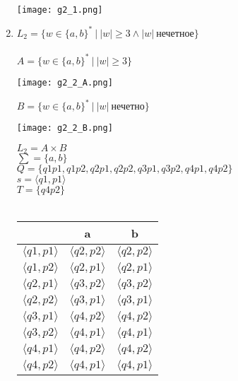 \documentclass{article}
\begin{document}
\begin{enumerate}
    \\ 
    \begin{flushleft}
        \texttt{[image: g2\_1.png]}
    \end{flushleft}
    \item {$L_2 = \{ w \in \{ a, b\}^* \ | \ |w| \geq 3 \wedge |w| \ \text{нечетное} \}$} \\ \\
    $A = \{ w \in \{ a, b\}^* \ | \ |w| \geq 3 \}$
    \begin{flushleft}
        \texttt{[image: g2\_2\_A.png]}
    \end{flushleft}
    $B = \{ w \in \{ a, b\}^* \ | \ |w| \ \text{нечетно} \}$
    \begin{flushleft}
        \texttt{[image: g2\_2\_B.png]}
    \end{flushleft}
    $L_2 = A \times B$ \\
    $\sum = \{a, b\}$ \\
    $Q = \{q1p1, q1p2, q2p1, q2p2, q3p1, q3p2, q4p1, q4p2\}$ \\
    $s = \langle q1, p1 \rangle $ \\
    $T = \{q4p2\}$ \\ \\
    \begin{tabular}{|c|c|c|}
        \hline
                              & a                         & b     \\ \hline
         $\langle q1,p1 \rangle$    & $\langle q2,p2 \rangle$   & $\langle q2,p2 \rangle$    \\
         $\langle q1,p2 \rangle$    & $\langle q2,p1 \rangle$   & $\langle q2,p1 \rangle$    \\ 
         $\langle q2,p1 \rangle$    & $\langle q3,p2 \rangle$   & $\langle q3,p2 \rangle$    \\
         $\langle q2,p2 \rangle$    & $\langle q3,p1 \rangle$   & $\langle q3,p1 \rangle$    \\ 
         $\langle q3,p1 \rangle$    & $\langle q4,p2 \rangle$   & $\langle q4,p2 \rangle$    \\
         $\langle q3,p2 \rangle$    & $\langle q4,p1 \rangle$   & $\langle q4,p1 \rangle$    \\  
         $\langle q4,p1 \rangle$    & $\langle q4,p2 \rangle$   & $\langle q4,p2 \rangle$    \\
         $\langle q4,p2 \rangle$    & $\langle q4,p1 \rangle$   & $\langle q4,p1 \rangle$    \\ \hline
    \end{tabular} \\
    

\end{enumerate}
\end{document}
